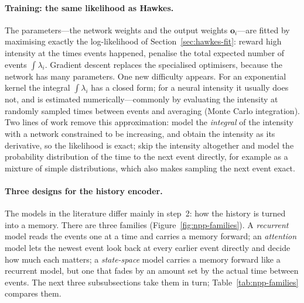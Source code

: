 \paragraph{Training: the same likelihood as Hawkes.} The parameters---the network weights and the
output weights $\mathbf{o}_i$---are fitted by maximising exactly the log-likelihood of
Section~\ref{sec:hawkes-fit}: reward high intensity at the times events happened, penalise the
total expected number of events $\int \lambda_i$. Gradient descent replaces the specialised
optimisers, because the network has many parameters. One new difficulty appears. For an exponential
kernel the integral $\int \lambda_i$ has a closed form; for a neural intensity it usually does not, and
is estimated numerically---commonly by evaluating the intensity at randomly sampled times between
events and averaging (Monte Carlo integration). Two lines of work remove this approximation:
\citet{omi2019} model the \emph{integral} of the intensity with a network constrained to be increasing,
and obtain the intensity as its derivative, so the likelihood is exact; \citet{shchur2020ifl} skip the
intensity altogether and model the probability distribution of the time to the next event directly,
for example as a mixture of simple distributions, which also makes sampling the next event exact.

\paragraph{Three designs for the history encoder.} The models in the literature differ mainly in step~2: how the history
is turned into a memory. There are three families (Figure~\ref{fig:npp-families}). A \emph{recurrent} model
reads the events one at a time and carries a memory forward; an \emph{attention} model lets the newest event look
back at every earlier event directly and decide how much each matters; a \emph{state-space} model carries a
memory forward like a recurrent model, but one that fades by an amount set by the actual time between events.
The next three subsubsections take them in turn; Table~\ref{tab:npp-families} compares them.

